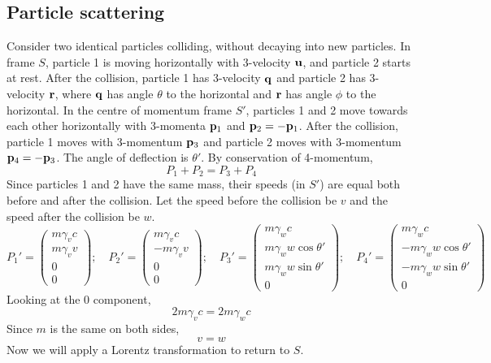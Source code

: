 \subsection{Particle scattering}
Consider two identical particles colliding, without decaying into new particles.
In frame \(S\), particle 1 is moving horizontally with 3-velocity \(\vb u\), and particle 2 starts at rest.
After the collision, particle 1 has 3-velocity \(\vb q\) and particle 2 has 3-velocity \(\vb r\), where \(\vb q\) has angle \(\theta\) to the horizontal and \(\vb r\) has angle \(\phi\) to the horizontal.
In the centre of momentum frame \(S'\), particles 1 and 2 move towards each other horizontally with 3-momenta \(\vb p_1\) and \(\vb p_2 = -\vb p_1\).
After the collision, particle 1 moves with 3-momentum \(\vb p_3\) and particle 2 moves with 3-momentum \(\vb p_4 = -\vb p_3\).
The angle of deflection is \(\theta'\).
By conservation of 4-momentum,
\[
	P_1 + P_2 = P_3 + P_4
\]
Since particles 1 and 2 have the same mass, their speeds (in \(S'\)) are equal both before and after the collision.
Let the speed before the collision be \(v\) and the speed after the collision be \(w\).
\[
	P_1' = \begin{pmatrix}
		m\gamma_v c \\
		m\gamma_v v \\
		0           \\
		0
	\end{pmatrix};\quad P_2' = \begin{pmatrix}
		m\gamma_v c  \\
		-m\gamma_v v \\
		0            \\
		0
	\end{pmatrix};\quad P_3' = \begin{pmatrix}
		m\gamma_w c             \\
		m\gamma_w w \cos\theta' \\
		m\gamma_w w \sin\theta' \\
		0
	\end{pmatrix};\quad P_4' = \begin{pmatrix}
		m\gamma_w c              \\
		-m\gamma_w w \cos\theta' \\
		-m\gamma_w w \sin\theta' \\
		0
	\end{pmatrix}
\]
Looking at the 0 component,
\[
	2 m\gamma_v c = 2m\gamma_w c
\]
Since \(m\) is the same on both sides,
\[
	v = w
\]
Now we will apply a Lorentz transformation to return to \(S\).
